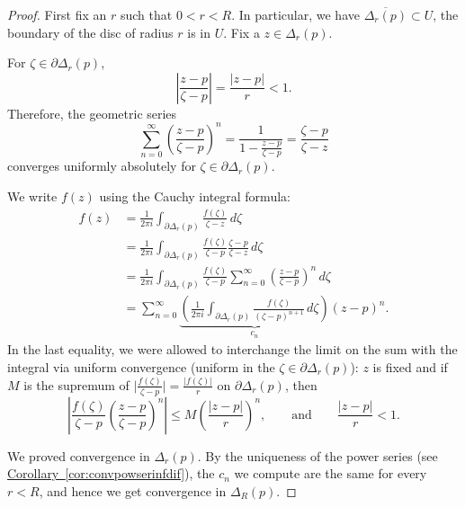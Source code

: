 \documentclass[12pt,openany]{book}
\newcommand{\sabs}[1]{\lvert {#1} \rvert}
\newcommand{\babs}[1]{\bigl\lvert {#1} \bigr\rvert}
\newcommand{\abs}[1]{\left\lvert {#1} \right\rvert}
\theoremstyle{plain}
\theoremstyle{remark}
\theoremstyle{definition}
\theoremstyle{exercise}
\theoremstyle{example}
\newcommand{\corref}[1]{\hyperref[#1]{Corollary~\ref*{#1}}}
\begin{document}
\begin{proof}
First fix an $r$ such that $0 < r < R$.
In particular, we have $\overline{\Delta_r(p)} \subset U$,
the boundary of the disc of radius $r$ is in $U$.
Fix a $z \in \Delta_r(p)$.

For $\zeta \in \partial \Delta_r(p)$, 
\begin{equation*}
\abs{\frac{z-p}{\zeta-p}} =
\frac{\sabs{z-p}}{r} < 1 .
\end{equation*}
Therefore,
the geometric series
\begin{equation*}
\sum_{n=0}^\infty
{\left(\frac{z-p}{\zeta-p}\right)}^n
=
\frac{1}{1-\frac{z-p}{\zeta-p}}
=
\frac{\zeta-p}{\zeta-z}
\end{equation*}
converges uniformly absolutely for $\zeta \in \partial \Delta_r(p)$.

We write $f(z)$ using the Cauchy integral formula:
\begin{equation*}
\begin{split}
f(z)
& =
\frac{1}{2\pi i}
\int_{\partial \Delta_r(p)}
\frac{f(\zeta)}{\zeta-z}
\,
d \zeta 
\\
& =
\frac{1}{2\pi i}
\int_{\partial \Delta_r(p)}
\frac{f(\zeta)}{\zeta-p}
\frac{\zeta-p}{\zeta-z}
\,
d \zeta 
\\
& =
\frac{1}{2\pi i}
\int_{\partial \Delta_r(p)}
\frac{f(\zeta)}{\zeta-p}
\sum_{n=0}^\infty
{\left(\frac{z-p}{\zeta-p}\right)}^n
\,
d \zeta 
\\
& =
\sum_{n=0}^\infty
\underbrace{
\left(
\frac{1}{2\pi i}
\int_{\partial \Delta_r(p)}
\frac{f(\zeta)}{{(\zeta-p)}^{n+1}}
\,
d \zeta 
\right)
}_{c_n}
{(z-p)}^n .
\end{split}
\end{equation*}
In the last equality, we were allowed to 
interchange the limit on the sum with the integral
via uniform convergence (uniform in the $\zeta \in \partial \Delta_r(p)$):
$z$ is fixed and if $M$ is the supremum of $\babs{\frac{f(\zeta)}{\zeta-p}} =
\frac{\sabs{f(\zeta)}}{r}$ on $\partial \Delta_r(p)$,
then
\begin{equation*}
\abs{
\frac{f(\zeta)}{\zeta-p}
{\left(\frac{z-p}{\zeta-p}\right)}^n
}
\leq
M 
{\left(\frac{\abs{z-p}}{r}\right)}^n,
\qquad \text{and} \qquad
\frac{\abs{z-p}}{r} < 1 .
\end{equation*}

We proved convergence in $\Delta_r(p)$.
By the uniqueness of the power series (see \corref{cor:convpowserinfdif}),
the $c_n$ we compute are the same for every $r < R$, and hence
we get convergence in $\Delta_R(p)$.
\end{proof}
\end{document}
